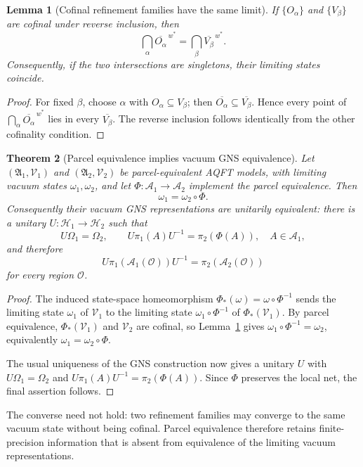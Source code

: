 \documentclass[11pt]{article}
\newtheorem{theorem}{Theorem}[section]
\newtheorem{lemma}[theorem]{Lemma}
\newcommand{\A}{\mathcal{A}}
\begin{document}
\begin{lemma}[Cofinal refinement families have the same limit]
\label{lem:cofinal-refinements}
If $\{O_\alpha\}$ and $\{V_\beta\}$ are cofinal under reverse inclusion,
then
\[
\bigcap_\alpha\overline{O_\alpha}^{\,w^*}
=
\bigcap_\beta\overline{V_\beta}^{\,w^*}.
\]
Consequently, if the two intersections are singletons, their limiting
states coincide.
\end{lemma}

\begin{proof}
For fixed $\beta$, choose $\alpha$ with $O_\alpha\subseteq V_\beta$;
then $\overline{O_\alpha}\subseteq\overline{V_\beta}$. Hence every point
of $\bigcap_\alpha\overline{O_\alpha}^{\,w^*}$ lies in every
$\overline{V_\beta}$. The reverse inclusion follows identically from the
other cofinality condition.
\end{proof}

\begin{theorem}[Parcel equivalence implies vacuum GNS equivalence]
\label{thm:parceleq}
Let $(\mathfrak A_1,\mathcal V_1)$ and
$(\mathfrak A_2,\mathcal V_2)$ be parcel-equivalent AQFT models, with
limiting vacuum states $\omega_1,\omega_2$, and let
$\Phi:\A_1\to\A_2$ implement the parcel equivalence. Then
\[
\omega_1=\omega_2\circ\Phi.
\]
Consequently their vacuum GNS representations are unitarily equivalent:
there is a unitary $U:\mathcal H_1\to\mathcal H_2$ such that
\[
U\Omega_1=\Omega_2,
\qquad
U\pi_1(A)U^{-1}=\pi_2(\Phi(A)),
\quad A\in\A_1,
\]
and therefore
\[
U\pi_1(\A_1(\mathcal O))U^{-1}
=
\pi_2(\A_2(\mathcal O))
\]
for every region $\mathcal O$.
\end{theorem}

\begin{proof}
The induced state-space homeomorphism
$\Phi_*(\omega)=\omega\circ\Phi^{-1}$ sends the limiting state
$\omega_1$ of $\mathcal V_1$ to the limiting state
$\omega_1\circ\Phi^{-1}$ of $\Phi_*(\mathcal V_1)$. By parcel
equivalence, $\Phi_*(\mathcal V_1)$ and $\mathcal V_2$ are cofinal, so
Lemma~\ref{lem:cofinal-refinements} gives
$\omega_1\circ\Phi^{-1}=\omega_2$, equivalently
$\omega_1=\omega_2\circ\Phi$.

The usual uniqueness of the GNS construction now gives a unitary $U$
with $U\Omega_1=\Omega_2$ and
$U\pi_1(A)U^{-1}=\pi_2(\Phi(A))$. Since $\Phi$ preserves the local net,
the final assertion follows.
\end{proof}

The converse need not hold: two refinement families may converge to the
same vacuum state without being cofinal. Parcel equivalence therefore
retains finite-precision information that is absent from equivalence of
the limiting vacuum representations.
\end{document}
